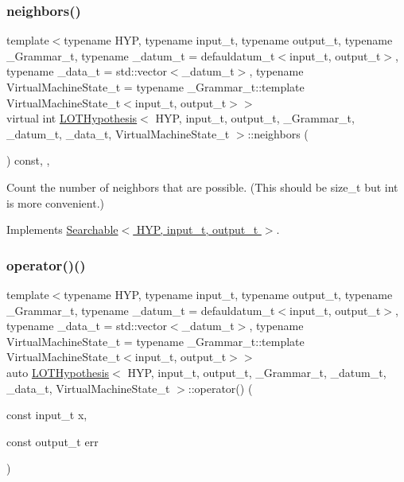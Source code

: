 \subsubsection{\texorpdfstring{neighbors()}{neighbors()}}
{\footnotesize\ttfamily template$<$typename H\+YP, typename input\+\_\+t, typename output\+\_\+t, typename \+\_\+\+Grammar\+\_\+t, typename \+\_\+datum\+\_\+t = defauldatum\+\_\+t$<$input\+\_\+t, output\+\_\+t$>$, typename \+\_\+data\+\_\+t = std\+::vector$<$\+\_\+datum\+\_\+t$>$, typename Virtual\+Machine\+State\+\_\+t = typename \+\_\+\+Grammar\+\_\+t\+::template Virtual\+Machine\+State\+\_\+t$<$input\+\_\+t, output\+\_\+t$>$$>$ \\
virtual int \hyperlink{class_l_o_t_hypothesis}{L\+O\+T\+Hypothesis}$<$ H\+YP, input\+\_\+t, output\+\_\+t, \+\_\+\+Grammar\+\_\+t, \+\_\+datum\+\_\+t, \+\_\+data\+\_\+t, Virtual\+Machine\+State\+\_\+t $>$\+::neighbors (\begin{DoxyParamCaption}{ }\end{DoxyParamCaption}) const\hspace{0.3cm}{\ttfamily [inline]}, {\ttfamily [override]}, {\ttfamily [virtual]}}



Count the number of neighbors that are possible. (This should be size\+\_\+t but int is more convenient.) 



Implements \hyperlink{class_searchable_aec30063fcc9bed5d005f8318efa8492d}{Searchable$<$ H\+Y\+P, input\+\_\+t, output\+\_\+t $>$}.

\mbox{\label{class_l_o_t_hypothesis_a7275626861140284ee08512fd0641ce1}} 
\subsubsection{\texorpdfstring{operator()()}{operator()()}}
{\footnotesize\ttfamily template$<$typename H\+YP, typename input\+\_\+t, typename output\+\_\+t, typename \+\_\+\+Grammar\+\_\+t, typename \+\_\+datum\+\_\+t = defauldatum\+\_\+t$<$input\+\_\+t, output\+\_\+t$>$, typename \+\_\+data\+\_\+t = std\+::vector$<$\+\_\+datum\+\_\+t$>$, typename Virtual\+Machine\+State\+\_\+t = typename \+\_\+\+Grammar\+\_\+t\+::template Virtual\+Machine\+State\+\_\+t$<$input\+\_\+t, output\+\_\+t$>$$>$ \\
auto \hyperlink{class_l_o_t_hypothesis}{L\+O\+T\+Hypothesis}$<$ H\+YP, input\+\_\+t, output\+\_\+t, \+\_\+\+Grammar\+\_\+t, \+\_\+datum\+\_\+t, \+\_\+data\+\_\+t, Virtual\+Machine\+State\+\_\+t $>$\+::operator() (\begin{DoxyParamCaption}\item[{const input\+\_\+t}]{x,  }\item[{const output\+\_\+t}]{err }\end{DoxyParamCaption})\hspace{0.3cm}{\ttfamily [inline]}}

